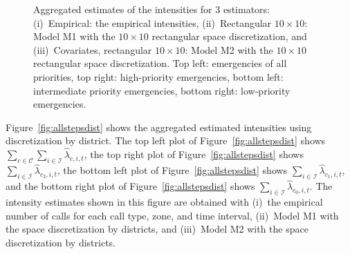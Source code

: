 \documentclass[article]{jss}
\begin{document}
\begin{figure}
\centering
\resizebox{\textwidth}{!}{
\begin{tabular}{cc}
\texttt{[image: AllstepsRectangularb\_v2.pdf]}&
\texttt{[image: AllstepsRectangularP1b\_v2.pdf]}\\
\texttt{[image: AllstepsRectangularP2b\_v2.pdf]}&
\texttt{[image: AllstepsRectangularP3b\_v2.pdf]}
\end{tabular}}
\caption{Aggregated estimates of the intensities for 3 estimators: (i)~Empirical: the empirical intensities, (ii)~Rectangular $10 \times 10$: Model M1 with the $10 \times 10$ rectangular space discretization,  and (iii)~Covariates, rectangular $10 \times 10$: Model M2 with the $10 \times 10$ rectangular space discretization.
Top left: emergencies of all priorities, top right: high-priority emergencies, bottom left: intermediate priority emergencies, bottom right: low-priority emergencies.
\label{fig:allstepsrect}}
\end{figure}

Figure~\ref{fig:allstepsdist} shows the aggregated estimated intensities using discretization by district.
The top left plot of Figure~\ref{fig:allstepsdist} shows $\sum_{c \in \mathcal{C}} \sum_{i \in \mathcal{I}} \hat{\lambda}_{c,i,t}$, the top right plot of Figure~\ref{fig:allstepsdist} shows $\sum_{i \in \mathcal{I}} \hat{\lambda}_{c_{2},i,t}$, the bottom left plot of Figure~\ref{fig:allstepsdist} shows $\sum_{i \in \mathcal{I}} \hat{\lambda}_{c_{1},i,t}$, and the bottom right plot of Figure~\ref{fig:allstepsdist} shows $\sum_{i \in \mathcal{I}} \hat{\lambda}_{c_{0},i,t}$.
The intensity estimates shown in this figure are obtained with (i)~the empirical number of calls for each call type, zone, and time interval, (ii)~Model M1 with the space discretization by districts, and (iii)~Model M2 with the space discretization by districts.
\end{document}
